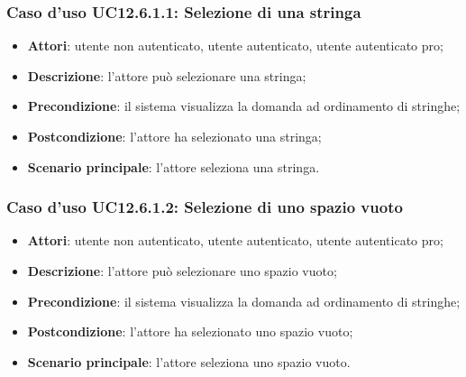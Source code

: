 \subsubsection{Caso d'uso UC12.6.1.1: Selezione di una stringa}
\begin{itemize}
\item \textbf{Attori}: utente non autenticato, utente autenticato, utente autenticato pro;
\item \textbf{Descrizione}: l'attore può selezionare una stringa;
\item \textbf{Precondizione}: il sistema visualizza la domanda ad ordinamento di stringhe;
\item \textbf{Postcondizione}: l'attore ha selezionato una stringa;
\item \textbf{Scenario principale}: l'attore seleziona una stringa.
\end{itemize}

\subsubsection{Caso d'uso UC12.6.1.2: Selezione di uno spazio vuoto}
\begin{itemize}
\item \textbf{Attori}: utente non autenticato, utente autenticato, utente autenticato pro;
\item \textbf{Descrizione}: l'attore può selezionare uno spazio vuoto;
\item \textbf{Precondizione}: il sistema visualizza la domanda ad ordinamento di stringhe;
\item \textbf{Postcondizione}: l'attore ha selezionato uno spazio vuoto;
\item \textbf{Scenario principale}: l'attore seleziona uno spazio vuoto.
\end{itemize}

